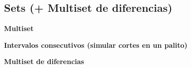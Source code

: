 \subsection{Sets (+ Multiset de diferencias)}
    \textbf{Multiset}
    

    \textbf{Intervalos consecutivos (simular cortes en un palito)}
    

    \textbf{Multiset de diferencias}
    